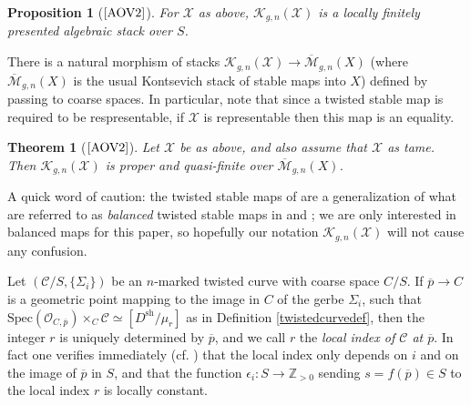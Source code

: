 \documentclass[11pt]{amsart}
\newtheorem{theorem}[subsection]{Theorem}
\newtheorem{proposition}[subsection]{Proposition}
\theoremstyle{definition}
\begin{document}
\begin{proposition}[$\textrm{\cite[4.2]{AOV2}}$]
For ${\mathcal{X}}$ as above, ${\mathcal{K}}_{g,n}({\mathcal{X}})$ is a locally finitely presented algebraic stack over $S$. 
\end{proposition}

There is a natural morphism of stacks ${\mathcal{K}}_{g,n}({\mathcal{X}}) \rightarrow \overline{\mathcal{M}}_{g,n}(X)$ (where $\overline{\mathcal{M}}_{g,n}(X)$ is the usual Kontsevich stack of stable maps into $X$) defined by passing to coarse spaces. In particular, note that since a twisted stable map is required to be respresentable, if ${\mathcal{X}}$ is representable then this map is an equality.

\begin{theorem}[$\textrm{\cite[4.3]{AOV2}}$]\label{propqfinite}
Let ${\mathcal{X}}$ be as above, and also assume that ${\mathcal{X}}$ as tame. Then ${\mathcal{K}}_{g,n}({\mathcal{X}})$ is proper and quasi-finite over $\overline{\mathcal{M}}_{g,n}(X)$.
\end{theorem}

A quick word of caution: the twisted stable maps of \cite{AOV2} are a generalization of what are referred to as \textit{balanced} twisted stable maps in \cite{AV} and \cite{ACV}; we are only interested in balanced maps for this paper, so hopefully our notation ${\mathcal{K}}_{g,n}({\mathcal{X}})$ will not cause any confusion. 

Let $({\mathcal{C}}/S,\{\Sigma_i\})$ be an $n$-marked twisted curve with coarse space $C/S$. If $\overline{p} \rightarrow C$ is a geometric point mapping to the image in $C$ of the gerbe $\Sigma_i$, such that $\mathrm{Spec}({\mathcal{O}}_{C,\overline{p}}) \times_C {\mathcal{C}} \simeq [D^{\mathrm{sh}}/\mu_r]$ as in Definition \ref{twistedcurvedef}, then the integer $r$ is uniquely determined by $\overline{p}$, and we call $r$ the \textit{local index of ${\mathcal{C}}$ at $\overline{p}$}. In fact one verifies immediately (cf. \cite[8.5.1]{AV}) that the local index only depends on $i$ and on the image of $\overline{p}$ in $S$, and that the function $\epsilon_i: S \rightarrow \mathbb{Z}_{>0}$ sending $s = f(\overline{p}) \in S$ to the local index $r$ is locally constant.
\end{document}
